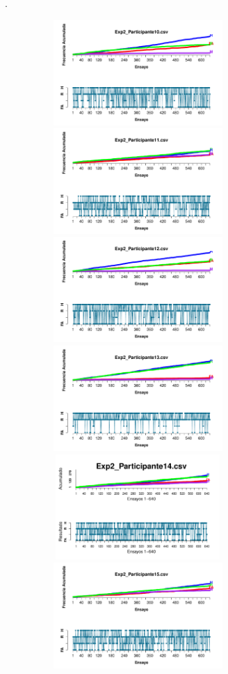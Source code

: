 \documentclass[a4paper ]{article}
\begin{document}
\vfill .
\begin{figure}[th]
\begin{center}
\includegraphics[width=8cm, height=4cm]{Figures/Outcome_Exp2_P10} \includegraphics[width=8cm, height=4cm]{Figures/Outcome_Exp2_P11} \includegraphics[width=8cm, height=4cm]{Figures/Outcome_Exp2_P12}
\includegraphics[width=8cm, height=4cm]{Figures/Outcome_Exp2_P13} \includegraphics[width=8cm, height=4cm]{Figures/Outcome_Exp2_P14} \includegraphics[width=8cm, height=4cm]{Figures/Outcome_Exp2_P15}

\end{center}
\end{figure}
\end{document}
